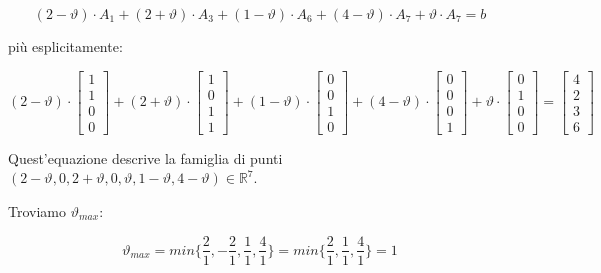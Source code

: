 \documentclass[11pt]{book}
\begin{document}
\begin{center}
\[
(2-\vartheta) \cdot A_1 + (2+\vartheta) \cdot A_3 + (1-\vartheta)
\cdot A_6 + (4-\vartheta) \cdot A_7 + \vartheta \cdot A_7 = b
\]
\end{center}

pi\`u esplicitamente:

\begin{center}
\[
(2-\vartheta) \cdot
\begin{bmatrix}
1 \\ 1 \\ 0 \\ 0
\end{bmatrix}
+ (2+\vartheta) \cdot
\begin{bmatrix}
1 \\ 0 \\ 1 \\ 1
\end{bmatrix}
+ (1-\vartheta) \cdot
\begin{bmatrix}
0 \\ 0 \\ 1 \\ 0
\end{bmatrix}
+ (4-\vartheta) \cdot
\begin{bmatrix}
0 \\ 0 \\ 0 \\ 1
\end{bmatrix}
+ \vartheta \cdot
\begin{bmatrix}
0 \\ 1 \\ 0 \\ 0
\end{bmatrix}
= 
\begin{bmatrix}
4 \\ 2 \\ 3 \\ 6
\end{bmatrix}
\]  
\end{center}

Quest'equazione descrive la famiglia di punti $(2-\vartheta, 0,
2+\vartheta, 0, \vartheta, 1-\vartheta, 4-\vartheta) \in
\mathbb{R}^7$.

Troviamo $\vartheta_{max}$: 

\begin{center}
\[
\vartheta_{max} =
min \biggr\{ \frac{2}{1},-\frac{2}{1},\frac{1}{1},\frac{4}{1} \biggr\}
=
min \biggr\{ \frac{2}{1},\frac{1}{1},\frac{4}{1} \biggr\}  = 1
\]
\end{center}
\end{document}
